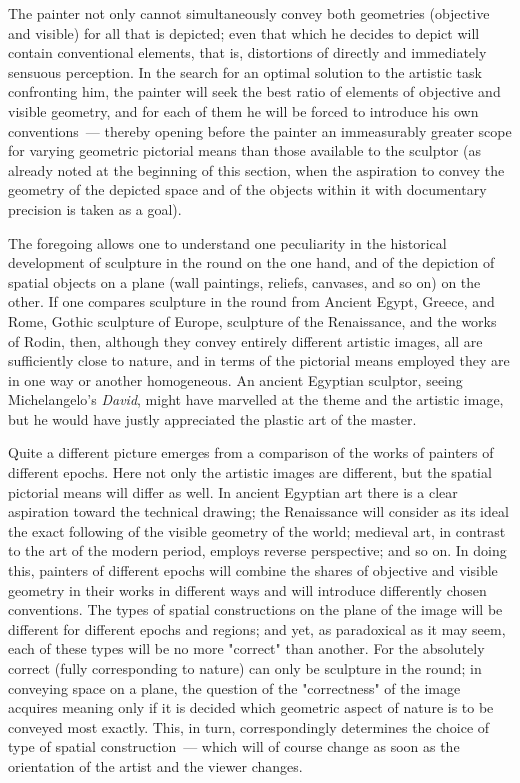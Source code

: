 The painter not only cannot simultaneously convey both geometries (objective and
visible) for all that is depicted; even that which he decides to depict will contain
conventional elements, that is, distortions of directly and immediately sensuous
perception. In the search for an optimal solution to the artistic task confronting him, the
painter will seek the best ratio of elements of objective and visible geometry, and for
each of them he will be forced to introduce his own conventions~--- thereby opening
before the painter an immeasurably greater scope for varying geometric pictorial
means than those available to the sculptor (as already noted at the beginning of this
section, when the aspiration to convey the geometry of the depicted space and of the
objects within it with documentary precision is taken as a goal).


The foregoing allows one to understand one peculiarity in the historical development of
sculpture in the round on the one hand, and of the depiction of spatial objects on a plane
(wall paintings, reliefs, canvases, and so on) on the other. If one compares sculpture in
the round from Ancient Egypt, Greece, and Rome, Gothic sculpture of Europe, sculpture
of the Renaissance, and the works of Rodin, then, although they convey entirely different
artistic images, all are sufficiently close to nature, and in terms of the pictorial means
employed they are in one way or another homogeneous. An ancient Egyptian sculptor,
seeing Michelangelo's \textit{David}, might have marvelled at the theme and the artistic
image, but he would have justly appreciated the plastic art of the master.

Quite a different picture emerges from a comparison of the works of painters of
different epochs. Here not only the artistic images are different, but the spatial pictorial
means will differ as well. In ancient Egyptian art there is a clear aspiration toward the
technical drawing; the Renaissance will consider as its ideal the exact following of the
visible geometry of the world; medieval art, in contrast to the art of the modern period,
employs reverse perspective; and so on. In doing this, painters of different epochs will
combine the shares of objective and visible geometry in their works in different ways and
will introduce differently chosen conventions. The types of spatial constructions on the
plane of the image will be different for different epochs and regions; and yet, as
paradoxical as it may seem, each of these types will be no more "correct" than another.
For the absolutely correct (fully corresponding to nature) can only be sculpture in the
round; in conveying space on a plane, the question of the "correctness" of the image
acquires meaning only if it is decided which geometric aspect of nature is to be conveyed
most exactly. This, in turn, correspondingly determines the choice of type of spatial
construction~--- which will of course change as soon as the orientation of the artist and
the viewer changes.

